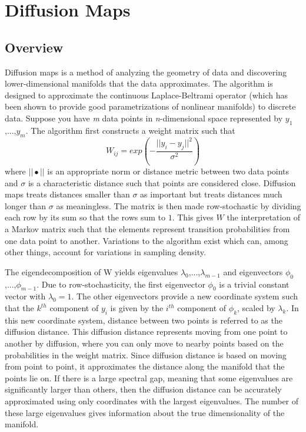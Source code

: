 \documentclass[12pt]{article}
\begin{document}
\section{Diffusion Maps}

\subsection{Overview} \label{DMO}

Diffusion maps is a method of analyzing the geometry of data and discovering lower-dimensional manifolds that the data approximates. The algorithm is designed to approximate the continuous Laplace-Beltrami operator (which has been shown to provide good parametrizations of nonlinear manifolds) to discrete data. Suppose you have \textit{m} data points in \textit{n}-dimensional space represented by $y_1$,...,$y_\textit{m}$. The algorithm first constructs a weight matrix such that\\
\[
W_{ij}=exp(-\frac{||y_i-y_j||^2}{\sigma ^2})
\]
where $|| \bullet ||$ is an appropriate norm or distance metric between two data points and $\sigma$ is a characteristic distance such that points are considered close. Diffusion maps treats distances smaller than $\sigma$ as important but treats distances much longer than $\sigma$ as meaningless. The matrix is then made row-stochastic by dividing each row by its sum so that the rows sum to $1$. This gives $W$ the interpretation of a Markov matrix such that the elements represent transition probabilities from one data point to another. Variations to the algorithm exist which can, among other things, account for variations in sampling density.\vspace{1mm}

The eigendecomposition of W yields eigenvalues $\lambda _0$,...,$\lambda_{m-1}$ and eigenvectors $\phi _0$,...,$\phi_{m-1}$. Due to row-stochasticity, the first eigenvector $\phi_0$ is a trivial constant vector with $\lambda_0 = 1$. The other eigenvectors provide a new coordinate system such that the $k^{th}$ component of $y_i$ is given by the $i^{th}$ component of $\phi_k$, scaled by $\lambda_k$. In this new coordinate system, distance between two points is referred to as the diffusion distance. This diffusion distance represents moving from one point to another by diffusion, where you can only move to nearby points based on the probabilities in the weight matrix. Since diffusion distance is based on moving from point to point, it approximates the distance along the manifold that the points lie on. If there is a large spectral gap, meaning that some eigenvalues are significantly larger than others, then the diffusion distance can be accurately approximated using only coordinates with the largest eigenvalues.  The number of these large eigenvalues gives information about the true dimensionality of the manifold.
\end{document}
